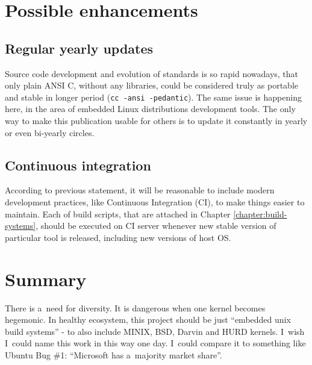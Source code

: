\documentclass[printmode]{mgr}
\begin{document}
\section{Possible enhancements}



\subsection*{Regular yearly updates}
Source code development and evolution of standards is so rapid nowadays, that only plain ANSI C, without any libraries, could be considered truly as portable and stable in longer period (\verb|cc -ansi -pedantic|).
The same issue is happening here, in the area of embedded Linux distributions development tools.
The only way to make this publication usable for others is to update it constantly in yearly or even bi-yearly circles.

\subsection*{Continuous integration}
According to previous statement, it will be reasonable to include modern development practices, like Continuous Integration (CI), to make things easier to maintain.
Each of build scripts, that are attached in Chapter \ref{chapter:build-systems}, should be executed on CI server whenever new stable version of particular tool is released, including new versions of host OS.

\section{Summary}


There is a~need for diversity. It is dangerous when one kernel becomes hegemonic. In healthy ecosystem, this project should be just ``embedded unix build systems'' - to also include MINIX, BSD, Darvin and HURD kernels. I~wish I~could name this work in this way one day. I~could compare it to something like Ubuntu Bug \#1: ``Microsoft has a~majority market share''.\cite{web:ubuntu-bug1}
\end{document}
